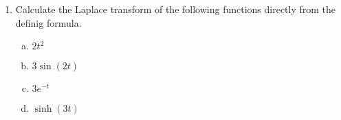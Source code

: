 \documentclass[a4paper,12pt]{article}
\begin{document}
\begin{enumerate}
\item Calculate the Laplace transform of the following functions directly from the definig formula. 
\begin{multicols}{2}
\begin{enumerate}[(a)]
    \item $2t^2$
    \item $3\sin(2t)$ 
    \item $3e^{-t}$ 
    \item $\sinh(3t)$
\end{enumerate}
\end{multicols}
\end{enumerate}
\end{document}
